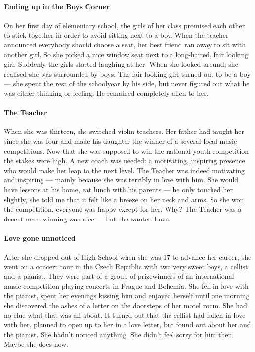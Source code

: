 \paragraph{Ending up in the Boys Corner}
On her first day of elementary school, the girls of her class promised each other to stick together in order to avoid sitting next to a boy. When the teacher announced everybody should choose a seat, her best friend ran away to sit with another girl. So she picked a nice window seat next to a long-haired, fair looking girl. Suddenly the girls started laughing at her. When she looked around, she realised she was surrounded by boys. The fair looking girl turned out to be a boy — she spent the rest of the schoolyear by his side, but never figured out what he was either thinking or feeling. He remained completely alien to her.

\paragraph{The Teacher}
When she was thirteen, she switched violin teachers. Her father had taught her since she was four and made his daughter the winner of a several local music competitions. Now that she was supposed to win the national youth competition the stakes were high. A new coach was needed: a motivating, inspiring presence who would make her leap to the next level. The Teacher was indeed motivating and inspiring — mainly because she was terribly in love with him. She would have lessons at his home, eat lunch with his parents — he only touched her slightly, she told me that it felt like a breeze on her neck and arms. So she won the competition, everyone was happy except for her. Why? The Teacher was a decent man: winning was nice — but she wanted Love.

\paragraph{Love gone unnoticed}
After she dropped out of High School when she was 17 to advance her career, she went on a concert tour in the Czech Republic with two very sweet boys, a cellist and a pianist. They were part of a group of prizewinners of an international music competition playing concerts in Prague and Bohemia. She fell in love with the pianist, spent her evenings kissing him and enjoyed herself until one morning she discovered the ashes of a letter on the doorsteps of her motel room. She had no clue what that was all about. It turned out that the cellist had fallen in love with her, planned to open up to her in a love letter, but found out about her and the pianist. She hadn't noticed anything. She didn't feel sorry for him then. Maybe she does now.

